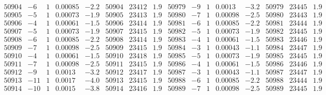 \documentclass[11pt,reqno,a4letter]{article}
\numberwithin{figure}{section}
\numberwithin{table}{section}
\theoremstyle{plain}
\numberwithin{theorem}{section}
\theoremstyle{definition}
\begin{document}
\begin{table}[ht]
\begin{equation*}
{\begin{array}{ccccc|ccc||ccccc|ccc}
50904 & -6 & 1 & 0.00085 & -2.2 & 50904 & 23412 & 1.9 & 50979 & -9 & 1 & 0.0013 & -3.2 & 50979 & 23445 & 1.9  \\
50905 & -5 & 1 & 0.00073 & -1.9 & 50905 & 23413 & 1.9 & 50980 & -7 & 1 & 0.00098 & -2.5 & 50980 & 23443 & 1.9  \\
50906 & -4 & 1 & 0.00061 & -1.5 & 50906 & 23414 & 1.9 & 50981 & -6 & 1 & 0.00085 & -2.2 & 50981 & 23444 & 1.9  \\
50907 & -5 & 1 & 0.00073 & -1.9 & 50907 & 23415 & 1.9 & 50982 & -5 & 1 & 0.00073 & -1.9 & 50982 & 23445 & 1.9  \\
50908 & -6 & 1 & 0.00085 & -2.2 & 50908 & 23414 & 1.9 & 50983 & -4 & 1 & 0.00061 & -1.5 & 50983 & 23446 & 1.9  \\
50909 & -7 & 1 & 0.00098 & -2.5 & 50909 & 23415 & 1.9 & 50984 & -3 & 1 & 0.00043 & -1.1 & 50984 & 23447 & 1.9  \\
50910 & -4 & 1 & 0.00061 & -1.5 & 50910 & 23418 & 1.9 & 50985 & -5 & 1 & 0.00073 & -1.9 & 50985 & 23445 & 1.9  \\
50911 & -7 & 1 & 0.00098 & -2.5 & 50911 & 23415 & 1.9 & 50986 & -4 & 1 & 0.00061 & -1.5 & 50986 & 23446 & 1.9  \\
50912 & -9 & 1 & 0.0013 & -3.2 & 50912 & 23417 & 1.9 & 50987 & -3 & 1 & 0.00043 & -1.1 & 50987 & 23447 & 1.9  \\
50913 & -11 & 1 & 0.0017 & -4.0 & 50913 & 23415 & 1.9 & 50988 & -6 & 1 & 0.00085 & -2.2 & 50988 & 23444 & 1.9  \\
50914 & -10 & 1 & 0.0015 & -3.8 & 50914 & 23416 & 1.9 & 50989 & -7 & 1 & 0.00098 & -2.5 & 50989 & 23445 & 1.9  \\
\end{array} 
}
\end{equation*} 
\clearpage 

\end{table} 

\clearpage 
\end{document}
